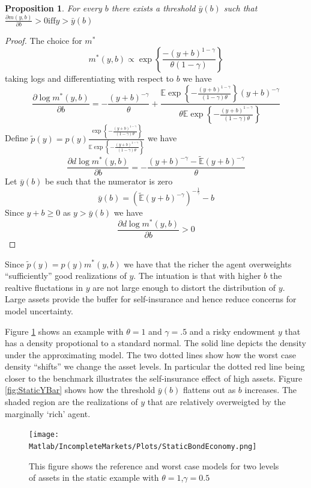 \documentclass[12pt]{article}
\newtheorem{proposition}{Proposition}
\begin{document}
\begin{proposition}
\label{propo-9}
For every $b$ there exists a threshold $\bar{y}(b)$ such that $\frac{\partial m(y,b)}{\partial b} >0 \text{iff} y>\bar{y}(b)$
\end{proposition}
\begin{proof}
The choice for $m^*$
\[m^*(y,b)\propto \exp\left\{\frac {-(y+b)^{1-\gamma}}{\theta(1-\gamma)}\right\}\]
taking logs and differentiating with respect to $b$ we have
\[\frac{\partial \log{m^*(y,b)}}{\partial b} = -\frac{(y+b)^{-\gamma}}{\theta}  + \frac{\mathbb{E} \exp \left\{ -\frac{(y+b)^{1-\gamma}}{(1-\gamma)\theta}\right\} (y+b)^{-\gamma}} {\theta \mathbb{E} \exp \left\{ -\frac{(y+b)^{1-\gamma}}{(1-\gamma)\theta} \right\}}\]
Define $\tilde{p}(y)=p(y)\frac{ \exp \left\{ -\frac{(y+b)^{1-\gamma}}{(1-\gamma)\theta}\right\} } { \mathbb{E} \exp \left\{ -\frac{(y+b)^{1-\gamma}}{(1-\gamma)\theta} \right\}}$
we have
\[\frac{\partial d \log{m^*(y,b)}}{\partial b} = -\frac{(y+b)^{-\gamma} - \tilde{\mathbb{E}}(y+b)^{-\gamma}}{\theta}\]
Let $\bar{y}(b)$ be such that the numerator is zero
\[\bar{y}(b) = \left(\tilde{\mathbb{E}} (y+b)^{-\gamma}\right)^{-\frac{1}{\gamma}}-b\]
Since $y+b\geq 0$ as $y>\bar{y}(b)$ we have 
\[\frac{\partial d \log{m^*(y,b)}}{\partial b}>0\]
\end{proof}
Since $\tilde{p}(y)=p(y)m^*(y,b)$ we have that the richer the agent overweights  ``sufficiently'' good realizations of $y$. The intuation is that with higher $b$ the realtive fluctations in $y$ are not large enough to distort the distribution of $y$. Large assets provide the buffer for self-insurance and hence reduce concerns for model uncertainty. 

Figure \ref{fig:StaticBondEconomy} shows an example with $\theta=1$ and $\gamma=.5$ and a risky endowment $y$ that has a density propotional to a standard normal. The solid line depicts the density under the approximating model. The two dotted lines show how the worst case density ``shifts'' we change the asset levels. In particular the dotted red line being closer to the benchmark illustrates the self-insurance effect of high assets. Figure \ref{fig:StaticYBar} shows how the threshold $\bar{y}(b)$ flattens out as $b$ increases. The shaded region are the realizations of $y$ that are relatively overweigted by the marginally `rich' agent.
	\begin{figure}[htbp]
\centering
	  \texttt{[image: Matlab/IncompleteMarkets/Plots/StaticBondEconomy.png]}

	\caption{This figure shows the reference and worst case models for two levels of assets in the static example with $\theta=1$,$\gamma=0.5$}
	\label{fig:StaticBondEconomy}
\end{figure} 
\end{document}
